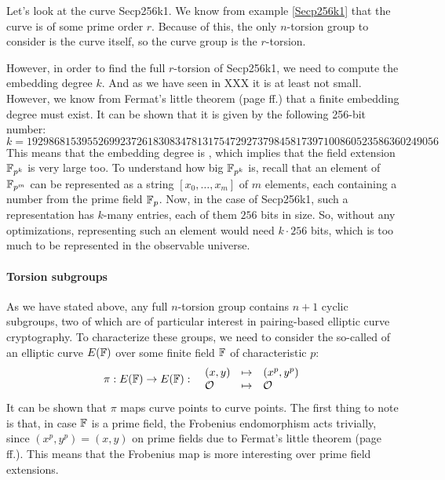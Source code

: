 \begin{example} 
Let's look at the curve Secp256k1. We know from example \ref{Secp256k1} that the curve is of some prime order $r$. Because of this, the only $n$-torsion group to consider is the curve itself, so the curve group is the $r$-torsion. 

However, in order to find the full $r$-torsion of Secp256k1, we need to compute the embedding degree $k$. And as we have seen in XXX it is at least not small. However, we know from Fermat's little theorem (page \pageref{fermats-little-theorem} ff.) that a finite embedding degree must exist. It can be shown that it is given by the following 256-bit number:
$$
k = \scriptstyle 192986815395526992372618308347813175472927379845817397100860523586360249056 
$$
 This means that the embedding degree is , which implies that the field extension $\mathbb{F}_{p^k}$ is very large too. To understand how big $\mathbb{F}_{p^k}$ is, recall that an element of $\mathbb{F}_{p^m}$ can be represented as a string $[x_0,\ldots,x_m]$ of $m$ elements, each containing a number from the prime field $\mathbb{F}_p$. Now, in the case of Secp256k1, such a representation has $k$-many entries, each of them $256$ bits in size. So, without any optimizations, representing such an element would need $k\cdot 256$ bits, which is too much to be represented in the observable universe.
\end{example}

\paragraph{Torsion subgroups}As we have stated above, any full $n$-torsion group contains $n+1$ cyclic subgroups, two of which are of particular interest in pairing-based elliptic curve cryptography. To characterize these groups, we need to consider the so-called  of an elliptic curve $E(\mathbb{F})$ over some finite field $\mathbb{F}$ of characteristic $p$:
\begin{equation}\label{eq:frobenius-enomorphism}
\pi : E(\mathbb{F}) \to E(\mathbb{F}): \;\; 
\begin{array}{lcl}
(x,y)       &\mapsto & (x^p,y^p)\\
\mathcal{O} &\mapsto & \mathcal{O}
\end{array} 
\end{equation}
It can be shown that $\pi$ maps curve points to curve points. The first thing to note is that, in case  $\mathbb{F}$ is a prime field, the Frobenius endomorphism acts trivially, since $(x^p,y^p) = (x,y)$ on prime fields due to Fermat's little theorem (page \pageref{fermats-little-theorem} ff.). This means that the Frobenius map is more interesting over prime field extensions.

